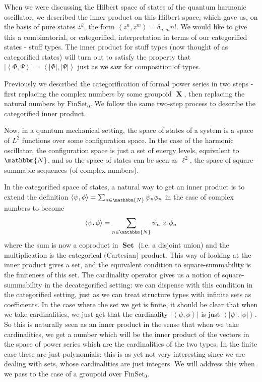 \documentclass{amsart} \usepackage{amsmath,amssymb,bbm}
\newcommand{\opname}[1]{\operatorname{#1}}
\newcommand{\catname}[1]{\boldsymbol{\opname{{#1}}}}
\newcommand{\FSN}{\catname{FinSet_0}}
\newcommand{\Set}{\catname{Set}}
\newcommand{\inprod}[1]{\left\langle{#1}\right\rangle}
\begin{document}
When we were discussing the Hilbert space of states of the quantum
harmonic oscillator, we described the inner product on this Hilbert
space, which gave us, on the basis of pure states $z^k$, the form
$\inprod{ z^n, z^m } = \delta_{n, m} n!$.  We would like to give this
a combinatorial, or categorified, interpretation in terms of our
categorified states - stuff types.  The inner product for stuff types
(now thought of as categorified states) will turn out to satisfy the
property that $| \inprod{ \Phi, \Psi } | = \inprod{ | \Phi |, | \Psi |
}$ just as we saw for composition of types.

Previously we described the categorification of formal power series in
two steps - first replacing the complex numbers by some groupoid
$\catname{X}$, then replacing the natural numbers by $\FSN$.  We
follow the same two-step process to describe the categorified inner
product.

Now, in a quantum mechanical setting, the space of states of a system is a
space of $L^2$ functions over some configuration space.  In the case
of the harmonic oscillator, the configuration space is just a set of
energy levels, equivalent to $\mathbbm{N}$, and so the space of states
can be seen as $\ell^2$, the space of square-summable sequences (of
complex numbers).  

In the categorified space of states, a natural way to get an inner
product is to extend the definition $\inprod{ \psi, \phi } = \sum_{n
\in \mathbbm{N}} \psi_n \phi_n$ in the case of complex numbers to
become
\begin{equation}
  \inprod{ \psi,\phi } = \sum_{n \in \mathbbm{N}} \psi_n \times \phi_n
\end{equation} where the sum is now a coproduct in $\Set$ (i.e. a
disjoint union) and the multiplication is the categorical (Cartesian)
product.  This way of looking at the inner product gives a set, and
the equivalent condition to square-summability is the finiteness of
this set.  The cardinality operator gives us a notion of
square-summability in the decategorified setting: we can dispense with
this condition in the categorified setting, just as we can treat
structure types with infinite sets as coefficients.  In the case where
the set we get is finite, it should be clear that when we take
cardinalities, we just get that the cardinality $|\inprod{\psi,\phi}|$
is just $\inprod{|\psi|,|\phi|}$.  So this is naturally seen as an
inner product in the sense that when we take cardinalities, we get a
number which will be the inner product of the vectors in the space of
power series which are the cardinalities of the two types.  In the
finite case these are just polynomials: this is as yet not very
interesting since we are dealing with sets, whose cardinalities are
just integers.  We will address this when we pass to the case of a
groupoid over $\FSN$.
\end{document}
